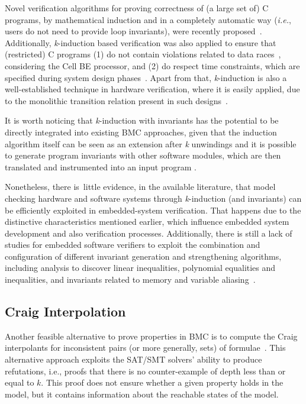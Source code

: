 \documentclass[format=acmsmall, review=false, screen=true]{acmart}
\begin{document}
Novel verification algorithms for proving correctness of (a large set of) C programs, by mathematical induction and in a completely automatic way ({\it i.e.}, users do not need to provide loop invariants), were recently proposed~\cite{Gadelha15,Beyer15,Brain15,Rocha15,Kinductor,Rocha17}. Additionally, \textit{k}-induction based verification was also applied to ensure that (restricted) C programs (1) do not contain violations related to data races~\cite{Donaldson10}, considering the Cell BE processor, and (2) do respect time constraints, which are specified during system design phases~\cite{EenS03}. Apart from that, \textit{k}-induction is also a well-established technique in hardware verification, where it is easily applied, due to the monolithic transition relation present in such designs~\cite{EenS03,Sheera00,GrosseLD09}.

It is worth noticing that \textit{k}-induction with invariants has the potential to be directly integrated into existing BMC approaches, given that the induction algorithm itself can be seen as an extension after \textit{k} unwindings and it is possible to generate program invariants with other software modules, which are then translated and instrumented into an input program \cite{Rocha15}.

Nonetheless, there is~little evidence, in the available literature, that model checking hardware and software systems through \textit{k}-induction (and invariants) can be efficiently exploited in embedded-system verification. That happens due to the distinctive characteristics mentioned earlier, which influence embedded system development and also verification processes. Additionally, there is still a lack of studies for embedded software verifiers to exploit the combination and configuration of different invariant generation and strengthening algorithms, including analysis to discover linear inequalities, polynomial equalities and inequalities, and invariants related to memory and variable aliasing~\cite{Bradley07}.

\subsection{Craig Interpolation}
\label{sec:CraigInterpolationInModelChecking}

Another feasible alternative to prove properties in BMC is to compute the Craig interpolants for inconsistent pairs (or more generally, sets) of formulae~\cite{McMillan03,McMillan05,McMillan06,McMillan07}. This alternative approach exploits the SAT/SMT solvers' ability to produce refutations, i.e., proofs that there is no counter-example of depth less than or equal to $k$. This proof does not ensure whether a given property holds in the model, but it contains information about the reachable states of the model.
\end{document}
